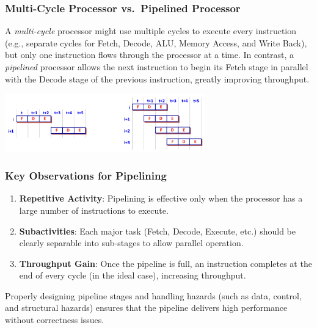 
\subsubsection*{Multi-Cycle Processor vs.\ Pipelined Processor}
A \emph{multi-cycle} processor might use multiple cycles to execute every instruction (e.g., separate cycles for Fetch, Decode, ALU, Memory Access, and Write Back), but only one instruction flows through the processor at a time. In contrast, a \emph{pipelined} processor allows the next instruction to begin its Fetch stage in parallel with the Decode stage of the previous instruction, greatly improving throughput.
\begin{center}
    \includegraphics[width=0.65\textwidth]{chapters/chapter4c/images/vs.png}
\end{center}
\subsubsection*{Key Observations for Pipelining}
\begin{enumerate}
    \item \textbf{Repetitive Activity}: Pipelining is effective only when the processor has a large number of instructions to execute.
    \item \textbf{Subactivities}: Each major task (Fetch, Decode, Execute, etc.) should be clearly separable into sub-stages to allow parallel operation.
    \item \textbf{Throughput Gain}: Once the pipeline is full, an instruction completes at the end of every cycle (in the ideal case), increasing throughput.
\end{enumerate}

\noindent Properly designing pipeline stages and handling hazards (such as data, control, and structural hazards) ensures that the pipeline delivers high performance without correctness issues.

